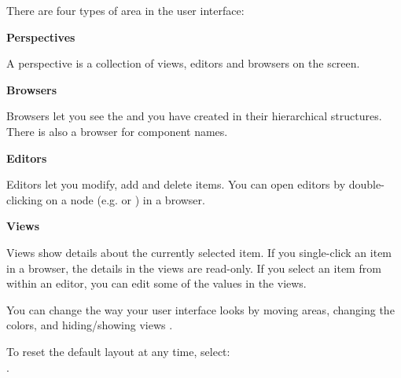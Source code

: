 
There are four types of area in the \app{} user interface:
\bigskip

\textbf{Perspectives}

A perspective is a collection of views, editors and browsers on the screen. 

\textbf{Browsers}

Browsers let you see the \gdcases{} and \gdsuites{} you have created in their hierarchical structures. There is also a browser for component names. 

\textbf{Editors}

Editors let you modify, add and delete items. You can open editors by double-clicking on a node (e.g. \gdsuite{} or \gdcase{}) in a browser. 

\textbf{Views}

Views show details about the currently selected item. If you single-click an item in a browser, the details in the views are read-only. If you select an item from within an editor, you can edit some of the values in the views.  

\bigskip

You can change the way your user interface looks by moving areas, changing the colors, and hiding/showing views . 

To reset the default layout at any time, select:\\
.



